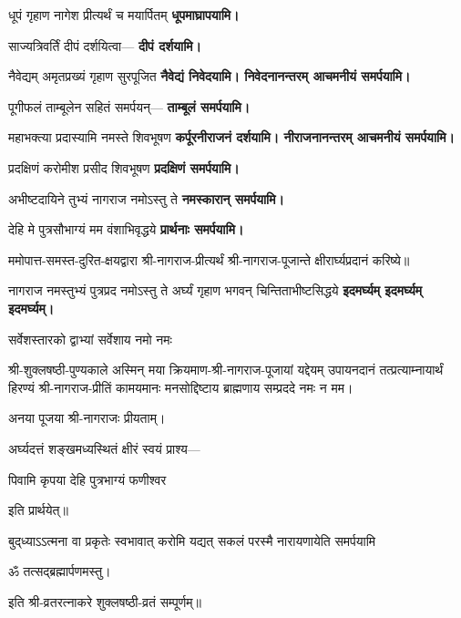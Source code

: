 \begin{center}

{धूपं गृहाण नागेश प्रीत्यर्थं च मयार्पितम्}
\textbf{\devAya{} धूपमाघ्रापयामि।}
\medskip

साज्यत्रिवर्तिं दीपं दर्शयित्वा—
\textbf{\devAya{} दीपं दर्शयामि।}
\medskip

{नैवेद्यम् अमृतप्रख्यं गृहाण सुरपूजित}
\textbf{\devAya{} नैवेद्यं निवेदयामि। निवेदनानन्तरम् आचमनीयं समर्पयामि।}
\medskip

पूगीफलं ताम्बूलेन सहितं समर्पयन्—
\textbf{\devAya{} ताम्बूलं समर्पयामि।}
\medskip

{महाभक्त्या प्रदास्यामि नमस्ते शिवभूषण}
\textbf{\devAya{} कर्पूरनीराजनं दर्शयामि। नीराजनानन्तरम् आचमनीयं समर्पयामि।}
\medskip

{प्रदक्षिणं करोमीश प्रसीद शिवभूषण}
\textbf{\devAya{} प्रदक्षिणं समर्पयामि।}
\medskip

{अभीष्टदायिने तुभ्यं नागराज नमोऽस्तु ते}
\textbf{\devAya{} नमस्कारान् समर्पयामि।}
\medskip

{देहि मे पुत्रसौभाग्यं मम वंशाभिवृद्धये}
\textbf{\devAya{} प्रार्थनाः समर्पयामि।}
\medskip

\resetShloka
ममोपात्त-समस्त-दुरित-क्षयद्वारा श्री-नागराज-प्रीत्यर्थं श्री-नागराज-पूजान्ते क्षीरार्घ्यप्रदानं करिष्ये॥

\twolineshloka
{नागराज नमस्तुभ्यं पुत्रप्रद नमोऽस्तु ते}
{अर्घ्यं गृहाण भगवन् चिन्तिताभीष्टसिद्धये}
\textbf{\devAya{} इदमर्घ्यम् इदमर्घ्यम् इदमर्घ्यम्।}


{सर्वेशस्तारको द्वाभ्यां सर्वेशाय नमो नमः}

\hiranyagarbha

श्री-शुक्लषष्ठी-पुण्यकाले अस्मिन् मया क्रियमाण-श्री-नागराज-पूजायां
यद्देयम् उपायनदानं तत्प्रत्याम्नायार्थं हिरण्यं श्री-नागराज-प्रीतिं
कामयमानः मनसोद्दिष्टाय ब्राह्मणाय सम्प्रददे नमः न मम।

अनया पूजया श्री-नागराजः प्रीयताम्।


अर्घ्यदत्तं शङ्खमध्यस्थितं क्षीरं स्वयं प्राश्य—

{पिवामि कृपया देहि पुत्रभाग्यं फणीश्वर}

इति प्रार्थयेत्॥

\end{center}


{बुद्‌ध्याऽऽत्मना वा प्रकृतेः स्वभावात्}
{करोमि यद्यत् सकलं परस्मै}
{नारायणायेति समर्पयामि}

\centerline{ॐ तत्सद्ब्रह्मार्पणमस्तु।}

इति श्री-व्रतरत्नाकरे शुक्लषष्ठी-व्रतं सम्पूर्णम्॥

\closesection
